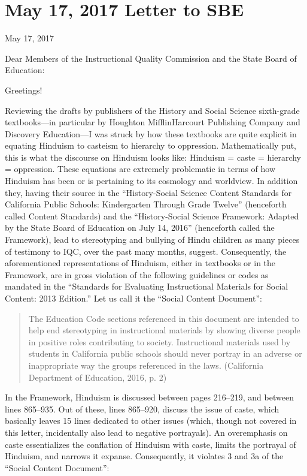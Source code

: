 \chapter{May 17, 2017 Letter to SBE}

May 17, 2017
\vskip 2pt

Dear Members of the Instructional Quality Commission and the State Board of Education:
\vskip 2pt

Greetings!
\vskip 2pt

Reviewing the drafts by publishers of the History and Social Science sixth-grade textbooks—in particular by Houghton MifflinHarcourt Publishing Company and Discovery Education—I was struck by how these textbooks are quite explicit in equating Hinduism to casteism to hierarchy to oppression. Mathematically put, this is what the discourse on Hinduism looks like: Hinduism = caste = hierarchy = oppression. These equations are extremely problematic in terms of how Hinduism has been or is pertaining to its cosmology and worldview. In addition they, having their source in the “History-Social Science Content Standards for California Public Schools: Kindergarten Through Grade Twelve” (henceforth called Content Standards) and the “History-Social Science Framework: Adapted by the State Board of Education on July 14, 2016” (henceforth called the Framework), lead to stereotyping and bullying of Hindu children as many pieces of testimony to IQC, over the past many months, suggest. Consequently, the aforementioned representations of Hinduism, either in textbooks or in the Framework, are in gross violation of the following guidelines or codes as mandated in the “Standards for Evaluating Instructional Materials for Social Content: 2013 Edition.” Let us call it the “Social Content Document”: 
\begin{quote}
The Education Code sections referenced in this document are intended to help end stereotyping in instructional materials by showing diverse people in positive roles contributing to society. Instructional materials used by students in California public schools should never portray in an adverse or inappropriate way the groups referenced in the laws. (California Department of Education, 2016, p. 2)
\end{quote}
In the Framework, Hinduism is discussed between pages 216--219, and between lines 865--935. Out of these, lines 865--920, discuss the issue of caste, which basically leaves 15 lines dedicated to other issues (which, though not covered in this letter, incidentally also lead to negative portrayals). An overemphasis on caste essentializes the conflation of Hinduism with caste, limits the portrayal of Hinduism, and narrows it expanse. Consequently, it violates 3 and 3a of the “Social Content Document”:

